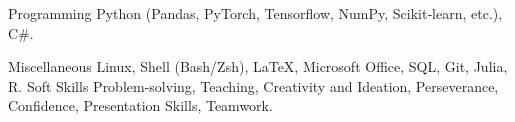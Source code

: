 

\begin{cvskills}

  \cvskill
    {Programming} %
    {Python (Pandas, PyTorch, Tensorflow, NumPy, Scikit‑learn, etc.), C\#.} %

  \cvskill
    {Miscellaneous} %
    {Linux, Shell (Bash/Zsh), \LaTeX, Microsoft Office, SQL, Git, Julia, R.} %
  \cvskill
    {Soft Skills} %
    {Problem-solving, Teaching, Creativity and Ideation, Perseverance, Confidence, Presentation Skills, Teamwork.} %

\end{cvskills}
